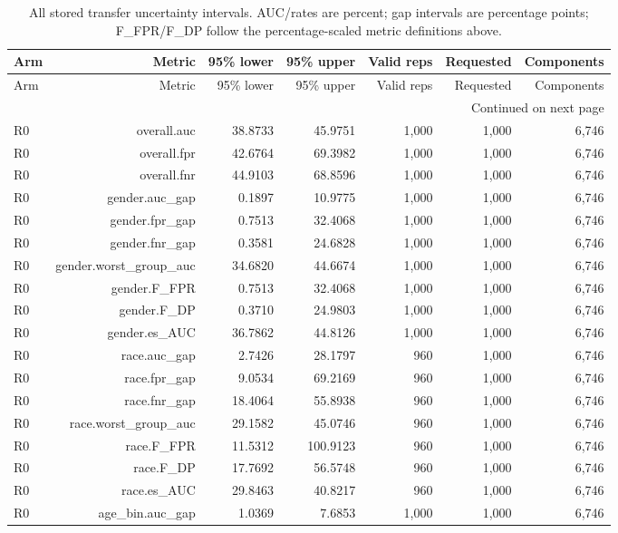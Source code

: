 \documentclass[10pt]{article}
\begin{document}
\begin{longtable}{@{}lrrrrrr@{}}
\caption{All stored transfer uncertainty intervals. AUC/rates are percent; gap intervals are percentage points; F\_FPR/F\_DP follow the percentage-scaled metric definitions above.}\\
\toprule
Arm & Metric & 95\% lower & 95\% upper & Valid reps & Requested & Components \\
\midrule
\endfirsthead
\toprule
Arm & Metric & 95\% lower & 95\% upper & Valid reps & Requested & Components \\
\midrule
\endhead
\midrule
\multicolumn{7}{r}{Continued on next page}\\
\endfoot
\bottomrule
\endlastfoot
R0 & overall.auc & 38.8733 & 45.9751 & 1,000 & 1,000 & 6,746 \\
R0 & overall.fpr & 42.6764 & 69.3982 & 1,000 & 1,000 & 6,746 \\
R0 & overall.fnr & 44.9103 & 68.8596 & 1,000 & 1,000 & 6,746 \\
R0 & gender.auc\_gap & 0.1897 & 10.9775 & 1,000 & 1,000 & 6,746 \\
R0 & gender.fpr\_gap & 0.7513 & 32.4068 & 1,000 & 1,000 & 6,746 \\
R0 & gender.fnr\_gap & 0.3581 & 24.6828 & 1,000 & 1,000 & 6,746 \\
R0 & gender.worst\_group\_auc & 34.6820 & 44.6674 & 1,000 & 1,000 & 6,746 \\
R0 & gender.F\_FPR & 0.7513 & 32.4068 & 1,000 & 1,000 & 6,746 \\
R0 & gender.F\_DP & 0.3710 & 24.9803 & 1,000 & 1,000 & 6,746 \\
R0 & gender.es\_AUC & 36.7862 & 44.8126 & 1,000 & 1,000 & 6,746 \\
R0 & race.auc\_gap & 2.7426 & 28.1797 & 960 & 1,000 & 6,746 \\
R0 & race.fpr\_gap & 9.0534 & 69.2169 & 960 & 1,000 & 6,746 \\
R0 & race.fnr\_gap & 18.4064 & 55.8938 & 960 & 1,000 & 6,746 \\
R0 & race.worst\_group\_auc & 29.1582 & 45.0746 & 960 & 1,000 & 6,746 \\
R0 & race.F\_FPR & 11.5312 & 100.9123 & 960 & 1,000 & 6,746 \\
R0 & race.F\_DP & 17.7692 & 56.5748 & 960 & 1,000 & 6,746 \\
R0 & race.es\_AUC & 29.8463 & 40.8217 & 960 & 1,000 & 6,746 \\
R0 & age\_bin.auc\_gap & 1.0369 & 7.6853 & 1,000 & 1,000 & 6,746 \\

\end{longtable}
\end{document}

